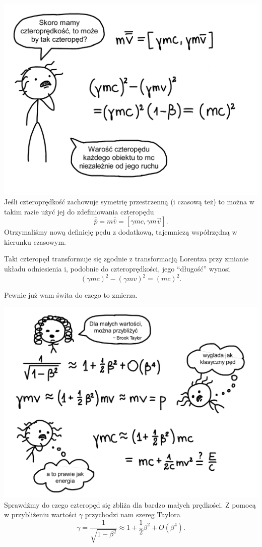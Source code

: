 \documentclass[10pt,twocolumn,fleqn,polish]{article}
\newcommand{\fourvec}[1]{\bar{\bar{#1}}}
\begin{document}
\noindent\includegraphics[width=1\linewidth]{pages/STA-page36}
Jeśli czteroprędkość zachowuje symetrię przestrzenną (i czasową też) to można
w takim razie użyć jej do zdefiniowania czteropędu
\[
  \fourvec{p} = m\fourvec{v} = [\gamma mc, \gamma m \vec v].
\]
Otrzymaliśmy nową definicję pędu z dodatkową, tajemniczą współrzędną w kierunku
czasowym.

Taki czteropęd transformuje się zgodnie z transformacją Lorentza przy zmianie
układu odniesienia i, podobnie do czteroprędkości, jego ``długość'' wynosi
\[
  (\gamma mc)^2 - (\gamma mv)^2 = (mc)^2.
\]

Pewnie już wam świta do czego to zmierza.
\newpage

\noindent\includegraphics[width=1\linewidth]{pages/STA-page37}
Sprawdźmy do czego czteropęd się zbliża dla bardzo małych prędkości.
Z pomocą w przybliżeniu wartości $\gamma$ przychodzi nam szereg Taylora
\[
  \gamma = \frac{1}{\sqrt{1-\beta^2}} \approx 1 + \frac{1}{2}\beta^2 + O(\beta^4).
\]
\end{document}
